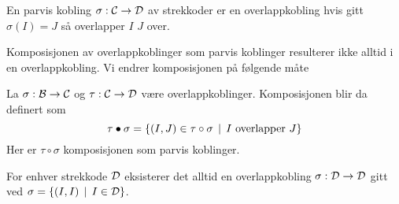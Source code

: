 \begin{definisjon}\label{def:OverlappMch}
  En parvis kobling $\sigma: \mathcal{C}\to \mathcal{D}$ av strekkoder
  er en overlappkobling hvis gitt $\sigma(I)=J$ så
  overlapper $I$ $J$ over.
\end{definisjon}

Komposisjonen av overlappkoblinger som parvis koblinger
resulterer ikke alltid i en overlappkobling. Vi endrer
komposisjonen på følgende måte

\begin{definisjon}\label{def:OK-Komp}
    La $\sigma: \mathcal{B}\to \mathcal{C}$ og $\tau:\mathcal{C}\to\mathcal{D}$
    være overlappkoblinger. Komposisjonen blir da
    definert som
    \[\tau\bullet\sigma
      = \left\{(I,J)\in\tau\circ\sigma\,\mid\,\text{$I$
    overlapper $J$}\right\}\]
    Her er $\tau\circ\sigma$ komposisjonen som parvis
    koblinger.
\end{definisjon}

\begin{proposisjon}\label{prop:ID-OK}
For enhver strekkode $\mathcal{D}$ eksisterer det alltid en
overlappkobling $\sigma:\mathcal{D}\to\mathcal{D}$ gitt ved $\sigma
= \left\{(I,I)\,\mid\,I\in\mathcal{D}\right\}$.
\end{proposisjon}

